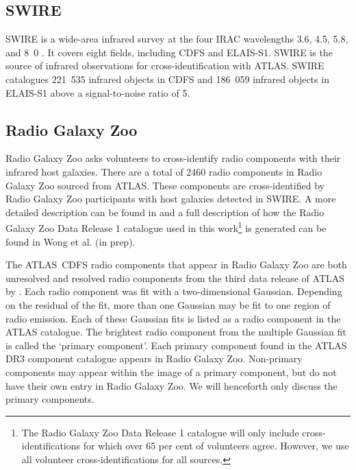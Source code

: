 \documentclass[fleqn,usenatbib,usedcolumn]{mnras}
\begin{document}
  \subsection{SWIRE}\label{sec:swire}

    SWIRE \citep{lonsdale03swire, surace05swire} is a wide-area infrared
    survey at the four IRAC wavelengths 3.6, 4.5, 5.8, and
    \unit{8.0}{\micro\meter} \citep{lonsdale03swire}. It covers eight fields, including CDFS and ELAIS-S1. SWIRE is the source of infrared
    observations for cross-identification with ATLAS. SWIRE catalogues 221~535
    infrared objects in CDFS and 186~059 infrared objects in ELAIS-S1 above a signal-to-noise ratio of 5.

  \subsection{Radio Galaxy Zoo}\label{sec:rgz}

    Radio Galaxy Zoo asks volunteers to cross-identify radio components with
    their infrared host galaxies. There are a total of 2460 radio
    components in Radio Galaxy Zoo sourced from ATLAS. These
    components are cross-identified by Radio Galaxy Zoo participants with host galaxies detected in SWIRE.
    A more detailed description can be found in
    \citet{banfield15} and a full description of how the Radio Galaxy Zoo Data Release 1 catalogue used in this work\footnote{The Radio Galaxy Zoo Data Release 1 catalogue will only include cross-identifications for which over 65 per cent of volunteers
    agree. However, we use all volunteer cross-identifications for all sources.}
    is generated can be found in Wong et al. (in prep).

     The ATLAS~CDFS radio components that appear in Radio Galaxy Zoo are both unresolved and resolved radio components from the third data release of ATLAS by \citet{franzen15}.  Each radio component was fit with a two-dimensional
    Gaussian. Depending on the residual of the fit, more than one Gaussian may
    be fit to one region of radio emission.  Each of these Gaussian fits is
    listed as a radio component in the ATLAS catalogue. The brightest radio
    component from the multiple Gaussian fit is called the `primary
    component'. Each primary component found in the ATLAS DR3 component
    catalogue appears in Radio Galaxy Zoo. Non-primary components may appear
    within the image of a primary component, but do not have their own entry
    in Radio Galaxy Zoo. We will henceforth only discuss the primary
    components.
\end{document}
